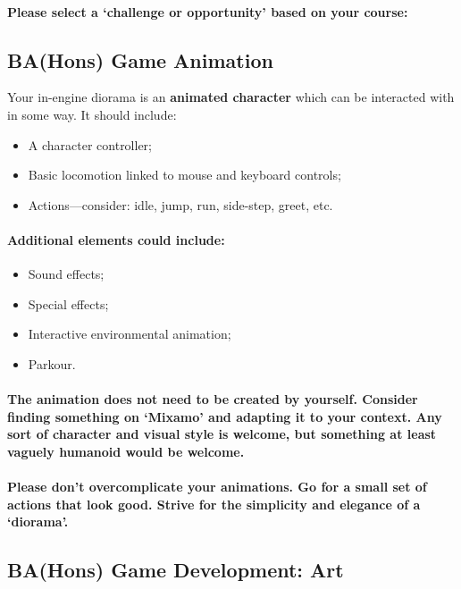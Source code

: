 \documentclass{../../fal_assignment}
\begin{document}
\paragraph{Please select a `challenge or opportunity' based on your course:}

\subsection*{BA(Hons) Game Animation}

Your in-engine diorama is an \textbf{animated character} which can be interacted with in some way. It should include:
\begin{itemize}
\item A character controller;
\item Basic locomotion linked to mouse and keyboard controls;
\item Actions---consider: idle, jump, run, side-step, greet, etc.
\end{itemize}
\paragraph{Additional elements could include:}
\begin{itemize}
\item Sound effects;
\item Special effects;
\item Interactive environmental animation; 
\item Parkour.
\end{itemize}
\paragraph{The animation does not need to be created by yourself. Consider finding something on `Mixamo' and adapting it to your context. Any sort of character and visual style is welcome, but something at least vaguely humanoid would be welcome.}

\paragraph{Please don’t overcomplicate your animations. Go for a small set of actions that look good. Strive for the simplicity and elegance of a ‘diorama’.}

\subsection*{BA(Hons) Game Development: Art}
\end{document}
